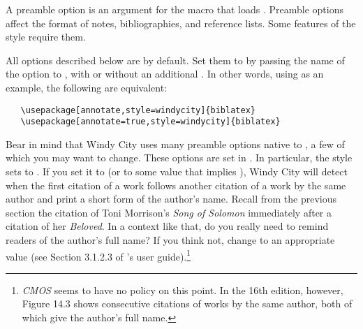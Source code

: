 \documentclass[11pt,letterpaper,oneside]{article}
\begin{document}
A preamble option is an argument for the  macro that
loads \biblatex. Preamble options affect the format of notes,
bibliographies, and reference lists. Some features of the style
require them.

All options described below are  by default. Set them to
 by passing the name of the option to \biblatex, with or
without an additional . In other words, using
 as an example, the following are equivalent:

\begin{verbatim}
   \usepackage[annotate,style=windycity]{biblatex}
   \usepackage[annotate=true,style=windycity]{biblatex}
\end{verbatim}

Bear in mind that Windy City uses many preamble options native to
\biblatex, a few of which you may want to change. These options are
set in . In particular, the style sets
 to . If you set it to  (or to
some value that implies ), Windy City will detect when the
first citation of a work follows another citation of a work by the
same author and print a short form of the author's name. Recall from
the previous section the citation of Toni Morrison's \textit{Song of
Solomon} immediately after a citation of her \textit{Beloved}. In a
context like that, do you really need to remind readers of the
author's full name? If you think not, change  to an
appropriate value (see Section 3.1.2.3 of \biblatex's user
guide).\footnote{\textit{CMOS} seems to have no policy on this point.
In the 16th edition, however, Figure 14.3 shows consecutive citations
of works by the same author, both of which give the author's full
name.}
\end{document}
